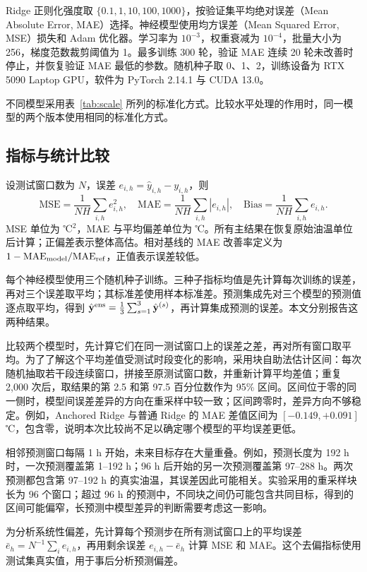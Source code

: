 \documentclass[UTF8,a4paper,11pt,fontset=windows]{ctexart}
\begin{document}
Ridge 正则化强度取 $\{0.1,1,10,100,1000\}$，按验证集平均绝对误差（Mean Absolute Error, MAE）选择。神经模型使用均方误差（Mean Squared Error, MSE）损失和 Adam 优化器。学习率为 $10^{-3}$，权重衰减为 $10^{-4}$，批量大小为 256，梯度范数裁剪阈值为 1。最多训练 300 轮，验证 MAE 连续 20 轮未改善时停止，并恢复验证 MAE 最低的参数。随机种子取 0、1、2，训练设备为 RTX 5090 Laptop GPU，软件为 PyTorch 2.14.1 与 CUDA 13.0。

不同模型采用表~\ref{tab:scale} 所列的标准化方式。比较水平处理的作用时，同一模型的两个版本使用相同的标准化方式。

\subsection{指标与统计比较}
设测试窗口数为 $N$，误差 $e_{i,h}=\hat y_{i,h}-y_{i,h}$，则
\begin{equation}
\mathrm{MSE}=\frac{1}{NH}\sum_{i,h}e_{i,h}^2,\quad
\mathrm{MAE}=\frac{1}{NH}\sum_{i,h}|e_{i,h}|,\quad
\mathrm{Bias}=\frac{1}{NH}\sum_{i,h}e_{i,h}.
\end{equation}
MSE 单位为 ℃$^2$，MAE 与平均偏差单位为 ℃。所有主结果在恢复原始油温单位后计算；正偏差表示整体高估。相对基线的 MAE 改善率定义为 $1-\mathrm{MAE}_{\rm model}/\mathrm{MAE}_{\rm ref}$，正值表示误差较低。

每个神经模型使用三个随机种子训练。三种子指标均值是先计算每次训练的误差，再对三个误差取平均；其标准差使用样本标准差。预测集成先对三个模型的预测值逐点取平均，得到 $\hat{\mathbf y}^{\rm ens}=\frac13\sum_{s=1}^3\hat{\mathbf y}^{(s)}$，再计算集成预测的误差。本文分别报告这两种结果。

比较两个模型时，先计算它们在同一测试窗口上的误差之差，再对所有窗口取平均。为了了解这个平均差值受测试时段变化的影响，采用块自助法估计区间：每次随机抽取若干段连续窗口，拼接至原测试窗口数，并重新计算平均差值；重复 2,000 次后，取结果的第 2.5 和第 97.5 百分位数作为 95\% 区间。区间位于零的同一侧时，模型间误差差异的方向在重采样中较一致；区间跨零时，差异方向不够稳定。例如，Anchored Ridge 与普通 Ridge 的 MAE 差值区间为 $[-0.149,+0.091]$ ℃，包含零，说明本次比较尚不足以确定哪个模型的平均误差更低。

相邻预测窗口每隔 1 h 开始，未来目标存在大量重叠。例如，预测长度为 192 h 时，一次预测覆盖第 1--192 h；96 h 后开始的另一次预测覆盖第 97--288 h。两次预测都包含第 97--192 h 的真实油温，其误差因此可能相关。实验采用的重采样块长为 96 个窗口；超过 96 h 的预测中，不同块之间仍可能包含共同目标，得到的区间可能偏窄，长预测中模型差异的判断需要考虑这一影响。

为分析系统性偏差，先计算每个预测步在所有测试窗口上的平均误差 $\bar e_h=N^{-1}\sum_i e_{i,h}$，再用剩余误差 $e_{i,h}-\bar e_h$ 计算 MSE 和 MAE。这个去偏指标使用测试集真实值，用于事后分析预测偏差。
\end{document}
